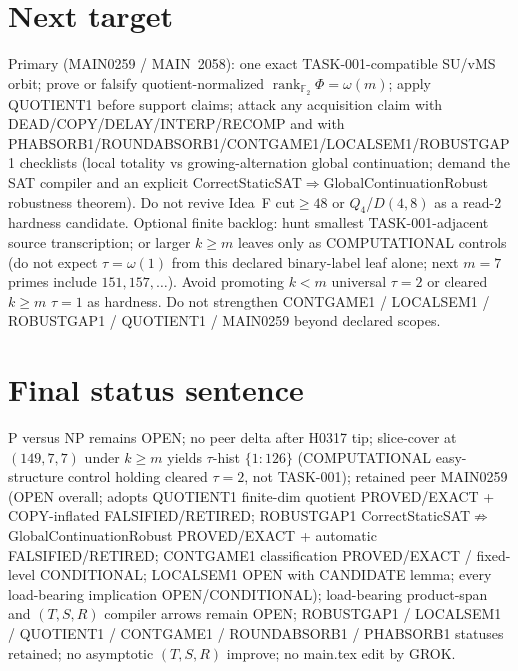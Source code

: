 \documentclass[11pt]{article}
\begin{document}
\section*{Next target}
Primary (MAIN0259 / MAIN~2058): one exact TASK-001-compatible SU/vMS orbit; prove or falsify
quotient-normalized $\operatorname{rank}_{\mathbb F_2}\Phi=\omega(m)$; apply QUOTIENT1 before support claims;
attack any acquisition claim with
DEAD/COPY/DELAY/INTERP/RECOMP and with PHABSORB1/ROUNDABSORB1/CONTGAME1/LOCALSEM1/ROBUSTGAP1 checklists
(local totality vs growing-alternation global continuation; demand the SAT compiler and an
explicit CorrectStaticSAT$\Rightarrow$GlobalContinuationRobust robustness theorem).
Do not revive Idea~F cut$\ge48$ or $Q_4$/$D(4,8)$ as a read-$2$ hardness candidate.
Optional finite backlog: hunt smallest TASK-001-adjacent source transcription;
or larger $k{\ge}m$ leaves only as COMPUTATIONAL controls (do not expect $\tau=\omega(1)$
from this declared binary-label leaf alone; next $m{=}7$ primes include $151,157,\ldots$).
Avoid promoting $k{<}m$ universal $\tau{=}2$ or cleared $k{\ge}m$ $\tau{=}1$ as hardness.
Do not strengthen CONTGAME1 / LOCALSEM1 / ROBUSTGAP1 / QUOTIENT1 / MAIN0259 beyond declared scopes.

\section*{Final status sentence}
P versus NP remains OPEN; no peer delta after H0317 tip; slice-cover at $(149,7,7)$ under $k{\ge}m$ yields $\tau$-hist $\{1{:}126\}$ (COMPUTATIONAL easy-structure control holding cleared $\tau{=}2$, not TASK-001); retained peer MAIN0259 (OPEN overall; adopts QUOTIENT1 finite-dim quotient PROVED/EXACT + COPY-inflated FALSIFIED/RETIRED; ROBUSTGAP1 CorrectStaticSAT$\not\Rightarrow$GlobalContinuationRobust PROVED/EXACT + automatic FALSIFIED/RETIRED; CONTGAME1 classification PROVED/EXACT / fixed-level CONDITIONAL; LOCALSEM1 OPEN with CANDIDATE lemma; every load-bearing implication OPEN/CONDITIONAL); load-bearing product-span and $(T,S,R)$ compiler arrows remain OPEN; ROBUSTGAP1 / LOCALSEM1 / QUOTIENT1 / CONTGAME1 / ROUNDABSORB1 / PHABSORB1 statuses retained; no asymptotic $(T,S,R)$ improve; no main.tex edit by GROK.
\end{document}
